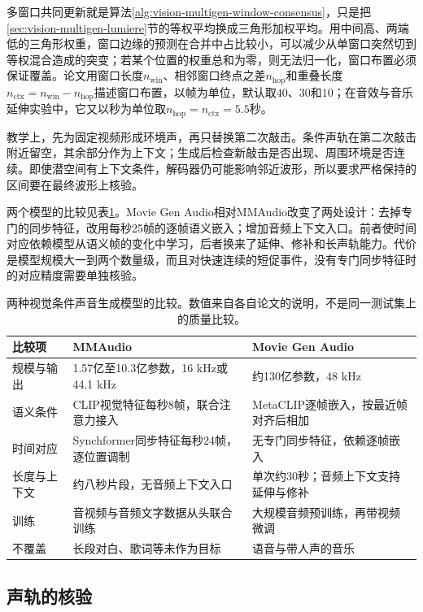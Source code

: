 多窗口共同更新就是算法\ref{alg:vision-multigen-window-consensus}，只是把\ref{sec:vision-multigen-lumiere}节的等权平均换成三角形加权平均。用中间高、两端低的三角形权重，窗口边缘的预测在合并中占比较小，可以减少从单窗口突然切到等权混合造成的突变；若某个位置的权重总和为零，则无法归一化，窗口布置必须保证覆盖。论文用窗口长度$n_{\mathrm{win}}$、相邻窗口终点之差$n_{\mathrm{hop}}$和重叠长度$n_{\mathrm{ctx}}=n_{\mathrm{win}}-n_{\mathrm{hop}}$描述窗口布置，以帧为单位，默认取$40$、$30$和$10$；在音效与音乐延伸实验中，它又以秒为单位取$n_{\mathrm{hop}}=n_{\mathrm{ctx}}=5.5$秒。

教学上，先为固定视频形成环境声，再只替换第二次敲击。条件声轨在第二次敲击附近留空，其余部分作为上下文；生成后检查新敲击是否出现、周围环境是否连续。即使潜空间有上下文条件，解码器仍可能影响邻近波形，所以要求严格保持的区间要在最终波形上核验。

两个模型的比较见表\ref{tab:vision-audio-gen-compare}。Movie Gen Audio相对MMAudio改变了两处设计：去掉专门的同步特征，改用每秒25帧的逐帧语义嵌入；增加音频上下文入口。前者使时间对应依赖模型从语义帧的变化中学习，后者换来了延伸、修补和长声轨能力。代价是模型规模大一到两个数量级，而且对快速连续的短促事件，没有专门同步特征时的对应精度需要单独核验。

\begin{table}[tbp]
 \centering
 \small
 \begin{tabularx}{\linewidth}{@{}p{24mm}XX@{}}
  \toprule
  比较项 & MMAudio & Movie Gen Audio \\
  \midrule
  规模与输出 & 1.57亿至10.3亿参数，16 kHz或44.1 kHz & 约130亿参数，48 kHz \\
  语义条件 & CLIP视觉特征每秒8帧，联合注意力接入 & MetaCLIP逐帧嵌入，按最近帧对齐后相加 \\
  时间对应 & Synchformer同步特征每秒24帧，逐位置调制 & 无专门同步特征，依赖逐帧嵌入 \\
  长度与上下文 & 约八秒片段，无音频上下文入口 & 单次约30秒；音频上下文支持延伸与修补 \\
  训练 & 音视频与音频文字数据从头联合训练 & 大规模音频预训练，再带视频微调 \\
  不覆盖 & 长段对白、歌词等未作为目标 & 语音与带人声的音乐 \\
  \bottomrule
 \end{tabularx}
 \caption{两种视觉条件声音生成模型的比较。数值来自各自论文的说明，不是同一测试集上的质量比较。}
 \label{tab:vision-audio-gen-compare}
\end{table}
\FloatBarrier

\subsection{声轨的核验}
\label{sec:vision-multigen-audio-check}

